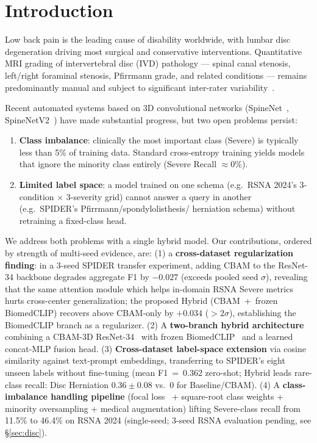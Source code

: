 \documentclass[runningheads]{llncs}
\begin{document}
\section{Introduction}
\label{sec:intro}

Low back pain is the leading cause of disability worldwide, with lumbar
disc degeneration driving most surgical and conservative interventions.
Quantitative MRI grading of intervertebral disc (IVD) pathology --- spinal
canal stenosis, left/right foraminal stenosis, Pfirrmann grade, and
related conditions --- remains predominantly manual and subject to
significant inter-rater variability~\cite{hallinan2021,nigru2024}.

Recent automated systems based on 3D convolutional networks
(SpineNet~\cite{jamaludin2017}, SpineNetV2~\cite{windsor2022}) have made
substantial progress, but two open problems persist:
\begin{enumerate}
\item \textbf{Class imbalance}: clinically the most important class
      (Severe) is typically less than 5\% of training data. Standard
      cross-entropy training yields models that ignore the minority
      class entirely (Severe Recall $\approx 0$\%).
\item \textbf{Limited label space}: a model trained on one schema (e.g.\
      RSNA 2024's 3-condition $\times$ 3-severity grid) cannot answer
      a query in another (e.g.\ SPIDER's Pfirrmann/spondylolisthesis/
      herniation schema) without retraining a fixed-class head.
\end{enumerate}

We address both problems with a single hybrid model. Our contributions,
ordered by strength of multi-seed evidence, are: (1) a
\textbf{cross-dataset regularization finding}: in a 3-seed SPIDER
transfer experiment, adding CBAM to the ResNet-34 backbone degrades
aggregate F1 by $-0.027$ (exceeds pooled seed $\sigma$), revealing
that the same attention module which helps in-domain RSNA Severe
metrics hurts cross-center generalization; the proposed Hybrid
(CBAM~+~frozen BiomedCLIP) recovers above CBAM-only by $+0.034$
($> 2\sigma$), establishing the BiomedCLIP branch as a regularizer.
(2) A \textbf{two-branch hybrid architecture} combining a CBAM-3D
ResNet-34~\cite{woo2018cbam,he2016resnet} with frozen
BiomedCLIP~\cite{zhang2023biomedclip} and a learned concat-MLP
fusion head. (3) \textbf{Cross-dataset label-space extension} via
cosine similarity against text-prompt embeddings, transferring to
SPIDER's eight unseen labels without fine-tuning (mean F1~=~0.362
zero-shot; Hybrid leads rare-class recall: Disc Herniation
$0.36 \pm 0.08$ vs.\ $0$ for Baseline/CBAM). (4) A
\textbf{class-imbalance handling pipeline} (focal
loss~\cite{lin2017focal} + square-root class weights + minority
oversampling + medical augmentation) lifting Severe-class recall
from 11.5\% to 46.4\% on RSNA 2024 (single-seed; 3-seed RSNA
evaluation pending, see \S\ref{sec:disc}).
\end{document}
